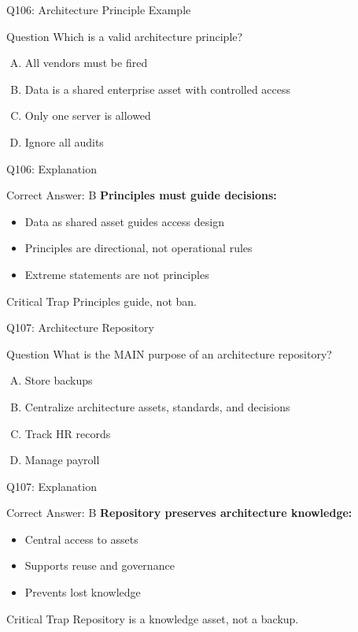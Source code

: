 \documentclass{beamer}
\begin{document}
	\begin{frame}{Q106: Architecture Principle Example}
		\begin{block}{Question}
			Which is a valid architecture principle?
		\end{block}
		\begin{enumerate}[(A)]
			\item All vendors must be fired
			\item Data is a shared enterprise asset with controlled access
			\item Only one server is allowed
			\item Ignore all audits
		\end{enumerate}
	\end{frame}
	
	\begin{frame}{Q106: Explanation}
		\begin{block}{Correct Answer: B}
			\textbf{Principles must guide decisions:}
			\begin{itemize}
				\item Data as shared asset guides access design
				\item Principles are directional, not operational rules
				\item Extreme statements are not principles
			\end{itemize}
		\end{block}
		\begin{alertblock}{Critical Trap}
			Principles guide, not ban.
		\end{alertblock}
	\end{frame}
	
	\begin{frame}{Q107: Architecture Repository}
		\begin{block}{Question}
			What is the MAIN purpose of an architecture repository?
		\end{block}
		\begin{enumerate}[(A)]
			\item Store backups
			\item Centralize architecture assets, standards, and decisions
			\item Track HR records
			\item Manage payroll
		\end{enumerate}
	\end{frame}
	
	\begin{frame}{Q107: Explanation}
		\begin{block}{Correct Answer: B}
			\textbf{Repository preserves architecture knowledge:}
			\begin{itemize}
				\item Central access to assets
				\item Supports reuse and governance
				\item Prevents lost knowledge
			\end{itemize}
		\end{block}
		\begin{alertblock}{Critical Trap}
			Repository is a knowledge asset, not a backup.
		\end{alertblock}
	\end{frame}
	
\end{document}
